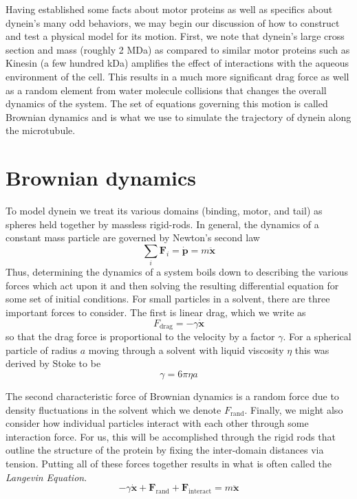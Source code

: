 Having established some facts about motor proteins as well as specifics about dynein's many odd behaviors, we may begin our discussion of how to construct and test a physical model for its motion. First, we note that dynein's large cross section and mass (roughly 2 MDa) \cite{johnson1983structure} as compared to similar motor proteins such as Kinesin (a few hundred kDa) \cite{liao1998kinesin} amplifies the effect of interactions with the  aqueous environment of the cell. This results in a much more significant drag force as well as a random element from water molecule collisions that changes the overall dynamics of the system. The set of equations governing this motion is called Brownian dynamics and is what we use to simulate the trajectory of dynein along the microtubule. 
	\section{Brownian dynamics}
	To model dynein we treat its various domains (binding, motor, and tail) as spheres held together by massless rigid-rods. In general, the dynamics of a constant mass particle are governed by Newton's second law
	\begin{equation}
		\sum_i \mathbf{F}_i = \dot{\mathbf{p}} = m\ddot{\mathbf{x}}
	\end{equation}
	Thus, determining the dynamics of a system boils down to describing the various forces which act upon it and then solving the resulting differential equation for some set of initial conditions. For small particles in a solvent, there are three important forces to consider. The first is linear drag, which we write as 
	\begin{equation}
		F_\text{drag} = -\gamma\dot{\mathbf{x}}
	\end{equation}
	so that the drag force is proportional to the velocity by a factor $\gamma$. For a spherical particle of radius $a$ moving through a solvent with liquid viscosity $\eta$ this was derived by Stoke to be 
	\begin{equation}
		\gamma = 6\pi\eta a
	\end{equation}
	
	
	The second characteristic force of Brownian dynamics is a random force due to density fluctuations in the solvent which we denote $F_\text{rand}$. Finally, we might also consider how individual particles interact with each other through some interaction force. For us, this will be accomplished through the rigid rods that outline the structure of the protein by fixing the inter-domain distances via tension. Putting all of these forces together results in what is often called the \textit{Langevin Equation}.
	\begin{equation}
		 -\gamma\dot{\mathbf{x}}+\mathbf{F}_\text{rand} + \mathbf{F}_\text{interact} = m\ddot{\mathbf{x}} 
	\end{equation}
	
